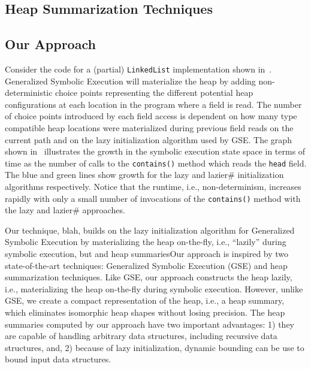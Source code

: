 \subsection{Heap Summarization Techniques}

\subsection{Our Approach}

Consider the code for a (partial) {\tt LinkedList} implementation
shown in~. 
Generalized Symbolic Execution will materialize the heap by adding
non-deterministic choice points representing the different potential heap
configurations at each location in the program where a field is read.
The number of choice points introduced by each field access is dependent
on how many type compatible heap locations were materialized during 
previous field reads on the current path
and on the lazy initialization algorithm used by GSE. 
The graph shown in~ illustrates the growth in the symbolic
execution state space 
in terms of time as the number of calls to the {\tt contains()} method which
reads the {\tt head} field.
The blue and green lines show growth for the lazy and lazier\# 
initialization algorithms respectively.
Notice that the runtime, i.e., non-determinism, increases rapidly with 
only a small number of invocations of the {\tt contains()} method
with the lazy and lazier\# approaches.

Our technique, blah, builds on the lazy initialization algorithm for
Generalized Symbolic Execution by materializing the heap on-the-fly, i.e.,
``lazily'' during symbolic execution, but
and heap summariesOur approach is inspired by two state-of-the-art techniques: Generalized 
Symbolic Execution (GSE) and heap summarization techniques. Like GSE,
our approach constructs the heap lazily, i.e., materializing the heap
on-the-fly during symbolic execution. However, unlike GSE, we create
a compact representation of the heap, i.e., a heap summary, which eliminates
isomorphic heap shapes without losing precision. The heap summaries computed
by our approach have two important advantages: 1) they are capable of 
handling arbitrary data structures, including recursive data structures,
and, 2) because of lazy initialization, dynamic bounding can be use to
bound input data structures.

